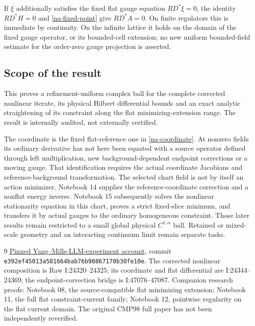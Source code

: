 \documentclass[11pt]{article}
\theoremstyle{remark}
\begin{document}
If $\xi$ additionally satisfies the fixed flat gauge equation
$RD^*\xi=0$, the identity $RD^*H=0$ and
\eqref{na-fixed-point} give $RD^*A=0$. On finite regulators this
is immediate by continuity. On the infinite lattice it holds on the
domain of the fixed gauge operator, or its bounded-cell extension;
no new uniform bounded-field estimate for the order-zero gauge
projection is asserted.

\subsection{Scope of the result}
\label{na-scope}

This proves a refinement-uniform complex ball for the complete
corrected nonlinear iterate, its physical Hilbert differential
bounds and an exact analytic straightening of its constraint along
the flat minimizing-extension range. The result is internally
audited, not externally certified.

The coordinate is the fixed flat-reference one in
\eqref{na-coordinate}. At nonzero fields its ordinary derivative
has not here been equated with a source operator defined through
left multiplication, new background-dependent endpoint corrections
or a moving gauge. That identification requires the actual
coordinate Jacobians and reference-background transformation.
The selected chart field is not by itself an action minimizer.
Notebook 14 supplies the reference-coordinate correction and a
nonflat energy inverse. Notebook 15 subsequently solves the
nonlinear stationarity equation in this chart, proves a strict
fixed-slice minimum, and transfers it by actual gauges to the
ordinary homogeneous constraint. Those later results remain
restricted to a small global physical $C^{1,\alpha}$ ball.
Retained or mixed-scale geometry and an interacting continuum
limit remain separate tasks.

\begin{thebibliography}{9}
\href{https://github.com/ethanwsussman/Yang--Mills-LLM-experiment/tree/e392ef45013a581664bab76b90867170b30fe10e}
{Pinned Yang--Mills-LLM-experiment account}, commit
\texttt{e392ef45013a581664bab76b90867170b30fe10e}.
The corrected nonlinear composition is Raw I:24320--24325;
its coordinate and flat differential are I:24344--24369;
the endpoint-correction bridge is I:47076--47087.
Companion research proofs: Notebook 08, the source-compatible flat
minimizing extension; Notebook 11, the full flat constraint-current
family; Notebook 12, pointwise regularity on the flat current domain.
The original CMP98 full paper has not been independently reverified.
\end{thebibliography}
\end{document}

